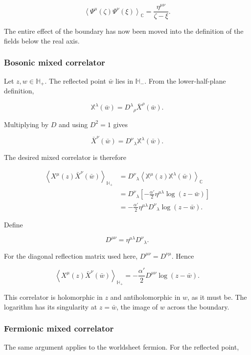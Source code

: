 \documentclass[
  10pt,
  a4paper,
  openany]{book}
\begin{document}
\[
\left\langle\Psi^\mu(\zeta)\Psi^\nu(\xi)\right\rangle_{\mathbb C}
=\frac{\eta^{\mu\nu}}{\zeta-\xi}.
\]

The entire effect of the boundary has now been moved into the definition
of the fields below the real axis.

\subsubsection{Bosonic mixed correlator}\label{bosonic-mixed-correlator}

Let \(z,w\in\mathbb H_+\). The reflected point \(\bar w\) lies in
\(\mathbb H_-\). From the lower-half-plane definition,

\[
\mathbb X^\lambda(\bar w)
=D^\lambda{}_\rho\bar X^\rho(\bar w).
\]

Multiplying by \(D\) and using \(D^2=1\) gives

\[
\bar X^\nu(\bar w)
=D^\nu{}_\lambda\mathbb X^\lambda(\bar w).
\]

The desired mixed correlator is therefore

\[
\begin{aligned}
\left\langle X^\mu(z)\bar X^\nu(\bar w)\right\rangle_{\mathbb H_+}
&=D^\nu{}_\lambda
\left\langle\mathbb X^\mu(z)\mathbb X^\lambda(\bar w)\right\rangle_{\mathbb C}\\
&=D^\nu{}_\lambda
\left[-\frac{\alpha'}2\eta^{\mu\lambda}\log(z-\bar w)\right]\\
&=-\frac{\alpha'}2
\eta^{\mu\lambda}D^\nu{}_\lambda
\log(z-\bar w).
\end{aligned}
\]

Define

\[
D^{\mu\nu}
=\eta^{\mu\lambda}D^\nu{}_\lambda.
\]

For the diagonal reflection matrix used here, \(D^{\mu\nu}=D^{\nu\mu}\).
Hence

\[
\boxed{
\left\langle X^\mu(z)\bar X^\nu(\bar w)\right\rangle_{\mathbb H_+}
=-\frac{\alpha'}2D^{\mu\nu}\log(z-\bar w).
}
\]

This correlator is holomorphic in \(z\) and antiholomorphic in \(w\), as
it must be. The logarithm has its singularity at \(z=\bar w\), the image
of \(w\) across the boundary.

\subsubsection{Fermionic mixed
correlator}\label{fermionic-mixed-correlator}

The same argument applies to the worldsheet fermion. For the reflected
point,
\end{document}

